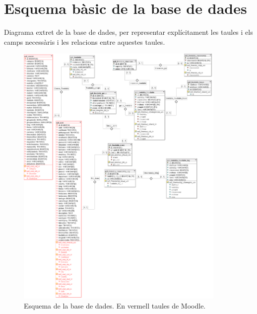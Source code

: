 \documentclass[a4paper]{report}  %
\begin{document}
\section{Esquema bàsic de la base de dades}
Diagrama extret de la base de dades, per representar explícitament les taules i els camps necessàris i les relacions entre aquestes taules.
		\begin{figure}[H] %
		\begin{center}
		\includegraphics[width=0.90\textwidth,keepaspectratio]{img/DiagramaBBDD-rf.png}
		\caption[List caption]{Esquema de la base de dades. En vermell taules de Moodle.}
		\label{fig:DiagramaBBDD-rf}
		\end{center}
		\end{figure}
\end{document}
